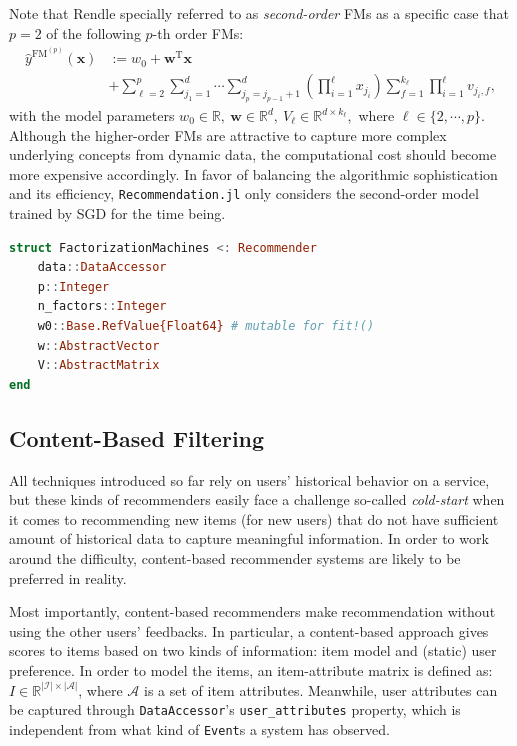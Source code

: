 Note that Rendle \cite{Rendle2012-1} specially referred to  as \textit{second-order} FMs as a specific case that $p=2$ of the following $p$-th order FMs:
\begin{align*}
\hat{y}^{\mathrm{FM}^{(p)}}(\mathbf{x}) &:= w_0 + \mathbf{w}^{\mathrm{T}} \mathbf{x} \\ &+ \sum^p_{\ell=2} \sum^d_{j_1 = 1} \cdots \sum^d_{j_p = j_{p-1} + 1} \left( \prod^{\ell}_{i=1} x_{j_i} \right) \sum^{k_{\ell}}_{f=1} \prod^{\ell}_{i=1} v_{j_i,f},
\end{align*}
with the model parameters $w_0 \in \mathbb{R}, \ \mathbf{w} \in \mathbb{R}^d, \ V_{\ell} \in \mathbb{R}^{d \times k_{\ell}},$ where $\ell \in \{2, \cdots, p\}$. Although the higher-order FMs are attractive to capture more complex underlying concepts from dynamic data, the computational cost should become more expensive accordingly. In favor of balancing the algorithmic sophistication and its efficiency, \texttt{Recommendation.jl} only considers the second-order model trained by SGD for the time being.

\begin{lstlisting}[language = Julia]
struct FactorizationMachines <: Recommender
    data::DataAccessor
    p::Integer
    n_factors::Integer
    w0::Base.RefValue{Float64} # mutable for fit!()
    w::AbstractVector
    V::AbstractMatrix
end
\end{lstlisting}

\subsection{Content-Based Filtering}

All techniques introduced so far rely on users' historical behavior on a service, but these kinds of recommenders easily face a challenge so-called \textit{cold-start} when it comes to recommending new items (for new users) that do not have sufficient amount of historical data to capture meaningful information. In order to work around the difficulty, content-based recommender systems \cite{Lops2011} are likely to be preferred in reality.

Most importantly, content-based recommenders make recommendation without using the other users' feedbacks. In particular, a content-based approach gives scores to items based on two kinds of information: item model and (static) user preference. In order to model the items, an item-attribute matrix is defined as: $I \in \mathbb{R}^{|\mathcal{I}| \times |\mathcal{A}|}$, where $\mathcal{A}$ is a set of item attributes. Meanwhile, user attributes can be captured through \texttt{DataAccessor}'s \texttt{user\_attributes} property, which is independent from what kind of \texttt{Event}s a system has observed.

